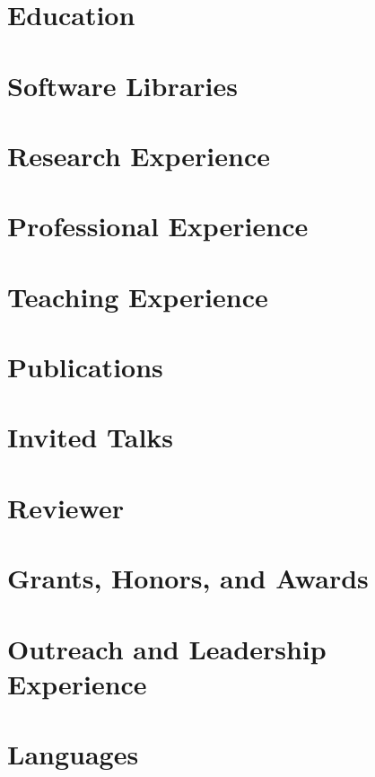 \documentclass[11pt,letterpaper,sans]{moderncv}
\begin{document}
    \makecvtitle

\section{Education}
    
    

\section{Software Libraries}
    

\section{Research Experience}
    
    
    
    
    
    
    

\section{Professional Experience}
    
    
    

\section{Teaching Experience}
    
    
    
    
    
    


\section{Publications}
    
    
    
    
    

\section{Invited Talks}
    

\section{Reviewer}
    

\section{Grants, Honors, and Awards}
    

\section{Outreach and Leadership Experience}
    

\section{Languages}
    

%     
\end{document}
